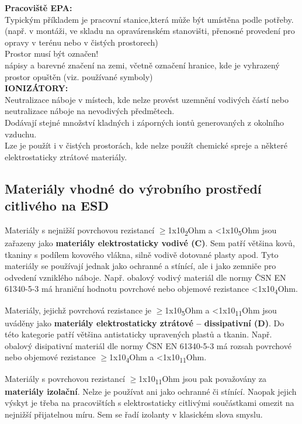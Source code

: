 \textbf{Pracoviště EPA:}\\
Typickým příkladem je pracovní stanice,která může být umístěna podle
potřeby.(např. v montáži, ve skladu na opravárenském stanovišti, přenosné
provedení pro opravy v terénu nebo v čistých prostorech)\\
Prostor musí být označen!\\
nápisy a barevné značení na zemi, včetně označení hranice, kde je vyhrazený prostor opuštěn (viz. používané symboly)\\

\textbf{IONIZÁTORY:}\\
Neutralizace náboje v místech, kde nelze provést uzemnění vodivých částí nebo neutralizace náboje na nevodivých předmětech.\\
Dodávají stejné množství kladných i záporných iontů generovaných z okolního
vzduchu.\\
Lze je použít i v čistých prostorách, kde nelze použít chemické spreje a některé
elektrostaticky ztrátové materiály.\\


\subsection{Materiály vhodné do výrobního prostředí citlivého na ESD}

Materiály s nejnižší povrchovou rezistancí $\geq$1x10\textsubscript{2}Ohm a <1x10\textsubscript{5}Ohm jsou zařazeny jako \textbf{materiály elektrostaticky vodivé (C)}. Sem patří většina kovů, tkaniny s podílem kovového vlákna, silně vodivě dotované plasty apod. Tyto materiály se používají jednak jako ochranné a stínící, ale i jako zemniče pro odvedení vzniklého náboje. Např. obalový vodivý materiál dle normy ČSN EN 61340-5-3 má hraniční hodnotu povrchové nebo objemové rezistance <1x10\textsubscript{4}Ohm.

Materiály, jejichž povrchová rezistance je $\geq$1x10\textsubscript{5}Ohm a <1x10\textsubscript{11}Ohm jsou uváděny jako \textbf{materiály elektrostaticky ztrátové – dissipativní (D)}. Do této kategorie patří většina antistaticky upravených plastů a tkanin. Např. obalový disipativní materiál dle normy ČSN EN 61340-5-3 má rozsah povrchové nebo objemové rezistance $\geq$1x10\textsubscript{4}Ohm a <1x10\textsubscript{11}Ohm.

Materiály s povrchovou rezistancí $\geq$1x10\textsubscript{11}Ohm jsou pak považovány za \textbf{materiály izolační}. Nelze je používat ani jako ochranné či stínící. Naopak jejich výskyt je třeba na pracovištích s elektrostaticky citlivými součástkami omezit na nejnižší přijatelnou míru. Sem se řadí izolanty v klasickém slova smyslu.
























